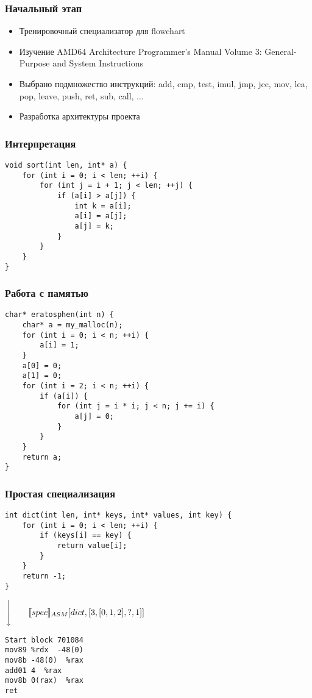 \documentclass[demo]{beamer}
\begin{document}
\begin{frame}\frametitle{Начальный этап}
\begin{itemize}
    \item {Тренировочный специализатор для flowchart}
    \vfill
    \item {Изучение AMD64 Architecture Programmer’s Manual Volume 3: General-Purpose and System Instructions}
    \vfill
    \item {Выбрано подмножество инструкций: add, cmp, test, imul, jmp, jcc, mov, lea, pop, leave, push, ret, sub, call, ...}
    \vfill
    \item {Разработка архитектуры проекта}
\end{itemize}
\end{frame}

\lstset{language=C}
\begin{frame}[fragile]\frametitle{Интерпретация}
\begin{lstlisting}
void sort(int len, int* a) {
    for (int i = 0; i < len; ++i) {
        for (int j = i + 1; j < len; ++j) {
            if (a[i] > a[j]) {
                int k = a[i];
                a[i] = a[j];
                a[j] = k;
            }
        }
    }
}
\end{lstlisting}
\end{frame}

\lstset{language=C}
\begin{frame}[fragile]\frametitle{Работа с памятью}
\begin{lstlisting}
char* eratosphen(int n) {
    char* a = my_malloc(n);
    for (int i = 0; i < n; ++i) {
        a[i] = 1;
    }
    a[0] = 0;
    a[1] = 0;
    for (int i = 2; i < n; ++i) {
        if (a[i]) {
            for (int j = i * i; j < n; j += i) {
                a[j] = 0;
            }
        }
    }
    return a;
}
\end{lstlisting}
\end{frame}

\lstset{language=C}
\begin{frame}[fragile]\frametitle{Простая специализация}
\begin{lstlisting}
int dict(int len, int* keys, int* values, int key) {
    for (int i = 0; i < len; ++i) {
        if (keys[i] == key) {
            return value[i];
        }
    }
    return -1;
}
\end{lstlisting}
\vfill
$\Bigg\downarrow{\qquad \llbracket spec \rrbracket_{ASM}[dict, [3, [0, 1, 2], ?, 1]] \qquad}$
\vfill
\begin{lstlisting}
Start block 701084
mov89 %rdx  -48(0) 
mov8b -48(0)  %rax 
add01 4  %rax 
mov8b 0(rax)  %rax 
ret
\end{lstlisting}

\end{frame}
\end{document}
